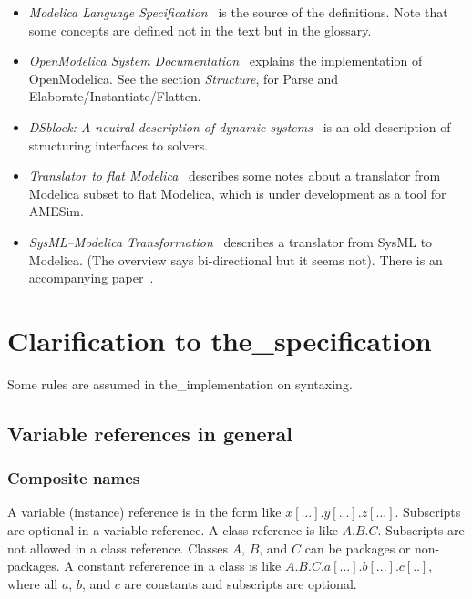 \documentclass[10pt,b5paper]{article}
\begin{document}
\begin{itemize}

\item {\it{}Modelica Language Specification}~\cite{specification34} is
the source of the definitions.  Note that some concepts are defined
not in the text but in the glossary.

\item {\it{}OpenModelica System Documentation}~\cite{openmodelica2014}
explains the implementation of OpenModelica.  See the section
{\it{}Structure}, for Parse and Elaborate/Instantiate/Flatten.

\item {\it{}DSblock: A neutral description of dynamic
systems}~\cite{otter1994} is an old description of structuring
interfaces to solvers.

\item {\it{}Translator to flat Modelica}~\cite{lms2007} describes some
notes about a translator from Modelica subset to flat Modelica, which
is under development as a tool for AMESim.

\item {\it{}SysML--Modelica Transformation}~\cite{omg2012} describes a
translator from SysML to Modelica.  (The overview says bi-directional
but it seems not).  There is an accompanying paper~\cite{paredis2010}.

\end{itemize}


\section{Clarification to the_specification}

Some rules are assumed in the_implementation on syntaxing.


\subsection{Variable references in general}

\subsubsection*{Composite names}

A variable (instance) reference is in the form like
$x[...].y[...].z[...]$.  Subscripts are optional in a variable
reference.  A class reference is like $A.B.C$.  Subscripts are not
allowed in a class reference.  Classes $A$, $B$, and $C$ can be
packages or non-packages.  A constant refererence in a class is like
$A.B.C.a[...].b[...].c[..]$, where all $a$, $b$, and $c$ are constants
and subscripts are optional.
\end{document}

